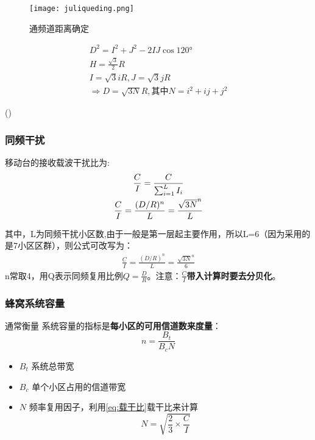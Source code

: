 	\begin{figure}[H]
		\centering
		\texttt{[image: juliqueding.png]}
		\caption{通频道距离确定}
	\end{figure}
	\begin{minipage}[c]{0.8\linewidth}
			\begin{gather*}
		D^2 = I^2 + J^2 - 2IJ\cos120°	\\
		H = \frac{\sqrt{3}}{2}R	\\
		I = \sqrt{3}iR,J = \sqrt{3}jR	\\
		\Rightarrow 
		D = \sqrt{3N}R,\text{其中}N = i^2+ij+j^2
		\end{gather*} 
	\end{minipage}
	\begin{minipage}[r]{0.2\linewidth}
		(\theequation)
	\end{minipage}
	
	\subsubsection{同频干扰}
	移动台的接收载波干扰比为: \\

	\begin{gather}
		\frac{C}{I} = \frac{C}{\sum_{i=1}^{L}I_i} \notag  \\
		\frac{C}{I} = \frac{(D/R)^n}{L}=\frac{\sqrt{3N}^n}{L} 
		\label{eq:载干比}
	\end{gather}

	其中，L为同频干扰小区数,由于一般是第一层起主要作用，所以L=6（因为采用的是7小区区群），则公式可改写为：
	\begin{eqnarray}
	\frac{C}{I} = \frac{(D/R)^n}{L}=\frac{\sqrt{3N}^n}{6} 
	\end{eqnarray}
	n常取4，用Q表示同频复用比例$Q = \frac{D}{R}$。注意：\textbf{\(\frac{C}{I}\)带入计算时要去分贝化}。
	\subsubsection{蜂窝系统容量}
	通常衡量
	系统容量的指标是\textbf{每小区的可用信道数来度量}：
	\begin{equation}
		n = \frac{B_t}{B_cN}
	\end{equation}
	\begin{itemize}
		\item $B_t$ 系统总带宽
		\item $B_c$ 单个小区占用的信道带宽
		\item $N$ 频率复用因子，利用\ref{eq:载干比}载干比来计算
		\begin{equation*}
			N = \sqrt{\frac{2}{3}\times \frac{C}{I}}
		\end{equation*}
	\end{itemize}
		
